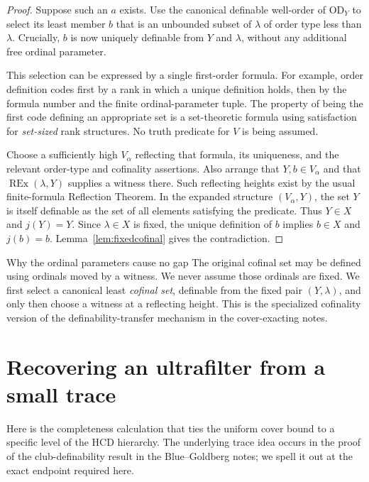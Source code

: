 \documentclass[11pt,letterpaper]{article}
\theoremstyle{definition}
\newcommand{\OD}{\mathrm{OD}}
\newcommand{\REx}{\operatorname{REx}}
\begin{document}
\begin{proof}
Suppose such an $a$ exists. Use the canonical definable well-order of
$\OD_Y$ to select its least member $b$ that is an unbounded subset of
$\lambda$ of order type less than $\lambda$. Crucially, $b$ is now uniquely
definable from $Y$ and $\lambda$, without any additional free ordinal parameter.

This selection can be expressed by a single first-order formula. For example,
order definition codes first by a rank in which a unique definition holds,
then by the formula number and the finite ordinal-parameter tuple. The
property of being the first code defining an appropriate set is a set-theoretic
formula using satisfaction for \emph{set-sized} rank structures. No truth
predicate for $V$ is being assumed.

Choose a sufficiently high $V_\alpha$ reflecting that formula, its uniqueness,
and the relevant order-type and cofinality assertions. Also arrange that
$Y,b\in V_\alpha$ and that $\REx(\lambda,Y)$ supplies a witness there. Such
reflecting heights exist by the usual finite-formula Reflection Theorem.
In the expanded structure $(V_\alpha,Y)$, the set $Y$ is itself definable as
the set of all elements satisfying the predicate. Thus $Y\in X$ and
$j(Y)=Y$. Since $\lambda\in X$ is fixed, the unique definition of $b$ implies
$b\in X$ and $j(b)=b$. Lemma~\ref{lem:fixedcofinal} gives the contradiction.
\end{proof}

\begin{assessment}{Why the ordinal parameters cause no gap}
The original cofinal set may be defined using ordinals moved by a witness.
We never assume those ordinals are fixed. We first select a canonical least
\emph{cofinal set}, definable from the fixed pair $(Y,\lambda)$, and only then
choose a witness at a reflecting height. This is the specialized cofinality
version of the definability-transfer mechanism in the cover-exacting notes.
\end{assessment}

\section{Recovering an ultrafilter from a small trace}\label{sec:trace}

Here is the completeness calculation that ties the uniform cover bound to a
specific level of the HCD hierarchy. The underlying trace idea occurs in the
proof of the club-definability result in the Blue--Goldberg notes; we spell it
out at the exact endpoint required here. \cite[proof of Theorem 3.7]{cover}
\end{document}
